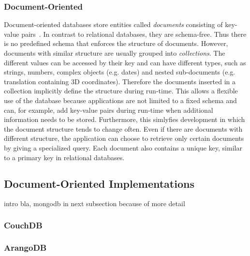 \subsubsection{Document-Oriented}
\label{sec:documene-design}
Document-oriented databases store entities called \emph{documents}
consisting of key-value
pairs~\cite{mongodb,document-comparison,document-description}. In
contrast to relational databases, they are schema-free. Thus there is
no predefined schema that enforces the structure of
documents. However, documents with similar structure are usually
grouped into \emph{collections}. The different values can be accessed
by their key and can have different types, such as strings, numbers,
complex objects (e.g. dates) and nested sub-documents
(e.g. translation containing 3D coordinates). Therefore the documents
inserted in a collection implicitly define the structure during
run-time. This allows a flexible use of the database because
applications are not limited to a fixed schema and can, for example,
add key-value pairs during run-time when additional information needs
to be stored. Furthermore, this simlyfies development in which the
document structure tends to change often. Even if there are documents
with different structure, the application can choose to retrieve only
certain documents by giving a specialized query. Each document also
contains a unique key, similar to a primary key in relational
databases.

\subsection{Document-Oriented Implementations}
\label{sec:documentdbs}
intro bla, mongodb in next subsection because of more detail

\subsubsection{CouchDB}
\label{sec:couchdb}

\subsubsection{ArangoDB}
\label{sec:arangodb}


